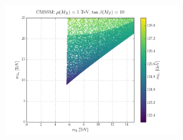 \documentclass[10pt,aspectratio=169]{beamer}
\begin{document}
\begin{frame}
\begin{columns}[t]
\begin{column}{0.6\textwidth}
      \vspace{-10pt}
      \begin{figure}
        \includegraphics[width=7.5cm]{cmssm_pos_mueff_1TeV_MSu6_MGlu_Mhh1}
      \end{figure}
    \end{column}
  \end{columns}
\end{frame}
\end{document}
